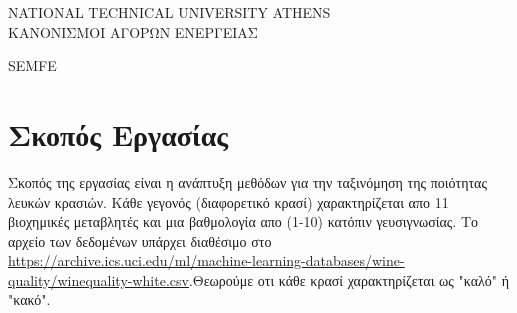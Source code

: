 \documentclass[12pt,a4paper]{article}
\begin{document}
\begin{titlepage}

	\begin{center}

	\vspace{0.8cm}
	\LARGE
	NATIONAL TECHNICAL UNIVERSITY ATHENS\\
	ΚΑΝΟΝΙΣΜΟΙ ΑΓΟΡΩΝ ΕΝΕΡΓΕΙΑΣ

	\vspace{0.8cm}
	\LARGE
	SEMFE



	\end{center}
\end{titlepage}

\renewcommand{\contentsname}{Περιεχόμενα}
\tableofcontents
\pagebreak



\section{Σκοπός Εργασίας}
Σκοπός της εργασίας είναι η ανάπτυξη μεθόδων για την ταξινόμηση της ποιότητας λευκών κρασιών. Κάθε γεγονός (διαφορετικό κρασί) χαρακτηρίζεται απο 11 βιοχημικές μεταβλητές και μια βαθμολογία απο (1-10) κατόπιν γευσιγνωσίας. Το αρχείο των δεδομένων υπάρχει διαθέσιμο στο \url{https://archive.ics.uci.edu/ml/machine-learning-databases/wine-quality/winequality-white.csv}.Θεωρούμε οτι κάθε κρασί χαρακτηρίζεται ως "καλό" ή "κακό".
\end{document}
